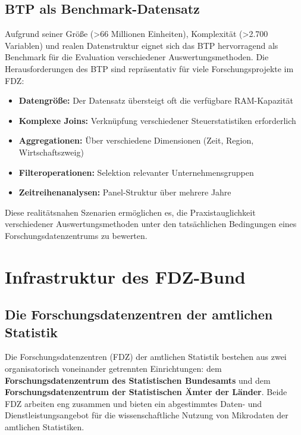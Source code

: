 \documentclass[
  ngerman,
  10pt,
  twocolumn]{article}
\providecommand{\tightlist}{%
  \setlength{\itemsep}{0pt}\setlength{\parskip}{0pt}}
\begin{document}
\subsection{BTP als
Benchmark-Datensatz}\label{btp-als-benchmark-datensatz}

Aufgrund seiner Größe (\textgreater66 Millionen Einheiten), Komplexität
(\textgreater2.700 Variablen) und realen Datenstruktur eignet sich das
BTP hervorragend als Benchmark für die Evaluation verschiedener
Auswertungsmethoden. Die Herausforderungen des BTP sind repräsentativ
für viele Forschungsprojekte im FDZ:

\begin{itemize}
\tightlist
\item
  \textbf{Datengröße:} Der Datensatz übersteigt oft die verfügbare
  RAM-Kapazität
\item
  \textbf{Komplexe Joins:} Verknüpfung verschiedener Steuerstatistiken
  erforderlich\\
\item
  \textbf{Aggregationen:} Über verschiedene Dimensionen (Zeit, Region,
  Wirtschaftszweig)
\item
  \textbf{Filteroperationen:} Selektion relevanter Unternehmensgruppen
\item
  \textbf{Zeitreihenanalysen:} Panel-Struktur über mehrere Jahre
\end{itemize}

Diese realitätsnahen Szenarien ermöglichen es, die Praxistauglichkeit
verschiedener Auswertungsmethoden unter den tatsächlichen Bedingungen
eines Forschungsdatenzentrums zu bewerten.

\section{Infrastruktur des FDZ-Bund}\label{sec-infrastruktur}

\subsection{Die Forschungsdatenzentren der amtlichen
Statistik}\label{die-forschungsdatenzentren-der-amtlichen-statistik}

Die Forschungsdatenzentren (FDZ) der amtlichen Statistik bestehen aus
zwei organisatorisch voneinander getrennten Einrichtungen: dem
\textbf{Forschungsdatenzentrum des Statistischen Bundesamts} und dem
\textbf{Forschungsdatenzentrum der Statistischen Ämter der Länder}.
Beide FDZ arbeiten eng zusammen und bieten ein abgestimmtes Daten- und
Dienstleistungsangebot für die wissenschaftliche Nutzung von Mikrodaten
der amtlichen Statistiken.
\end{document}
